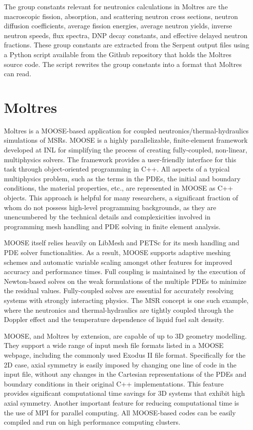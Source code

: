 The group constants relevant for neutronics calculations in Moltres are the
macroscopic fission, absorption, and scattering neutron cross sections,
neutron diffusion coefficients, average fission energies, average neutron
yields, inverse neutron speeds, flux spectra, \gls{DNP} decay constants, and
effective delayed neutron fractions. These group constants are extracted from
the Serpent output files using a Python script available from the Github
repository that holds the Moltres source code. The script rewrites the group
constants into a format that Moltres can read.

\section{Moltres}

Moltres is a \gls{MOOSE}-based application for coupled
neutronics/thermal-hydraulics simulations of \glspl{MSR}. \gls{MOOSE} is a
highly parallelizable,
finite-element framework developed at \gls{INL} for simplifying the process of
creating fully-coupled, non-linear, multiphysics solvers. The framework
provides a user-friendly interface for this task through object-oriented
programming in C++. All aspects of a typical multiphysics problem, such as the
terms in the \glspl{PDE}, the initial and boundary conditions, the material
properties, etc., are represented in \gls{MOOSE} as C++ objects. This approach
is helpful for many researchers, a significant fraction of whom do not possess
high-level programming backgrounds, as they are unencumbered by the
technical details and complexicities involved in programming mesh handling
and \gls{PDE} solving in finite element analysis.

\gls{MOOSE} itself relies heavily on LibMesh and PETSc for
its mesh handling and \gls{PDE} solver functionalities. As a result,
\gls{MOOSE} supports adaptive meshing schemes and automatic variable scaling
amongst other features for improved accuracy and performance times. Full
coupling is maintained by the execution of Newton-based solves on the
weak formulations of the multiple \glspl{PDE} to minimize the residual values.
Fully-coupled solves are essential for accurately resolving systems with
strongly interacting physics. The \gls{MSR} concept is one such example, where
the neutronics and thermal-hydraulics are tightly coupled through the Doppler
effect and the temperature dependence of liquid fuel salt density.

\gls{MOOSE}, and Moltres by extension, are capable of up to 3D geometry
modelling. They support a wide range of input mesh file formats listed in a
\gls{MOOSE} webpage, including the commonly used Exodus II file format.
Specifically for the 2D case, axial symmetry is easily imposed by changing
one line of code in the input file, without any changes in the Cartesian
representations of the \glspl{PDE} and boundary conditions in their original
C++ implementations. This feature provides significant computational time
savings for 3D systems that exhibit high axial symmetry. Another important
feature for reducing computational time is the use of MPI for parallel
computing. All \gls{MOOSE}-based codes can be easily compiled and run on high
performance computing clusters.


